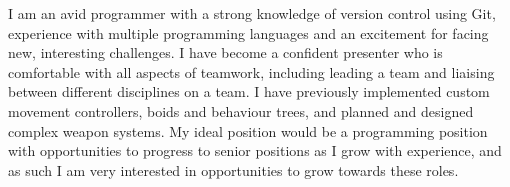 

\begin{cvparagraph}
    I am an avid programmer with a strong knowledge of version control using Git, experience with multiple programming languages and an excitement for facing new, interesting challenges. I have become a confident presenter who is comfortable with all aspects of teamwork, including leading a team and liaising between different disciplines on a team. I have previously implemented custom movement controllers, boids and behaviour trees, and planned and designed complex weapon systems. My ideal position would be a programming position with opportunities to progress to senior positions as I grow with experience, and as such I am very interested in opportunities to grow towards these roles.
\end{cvparagraph}
